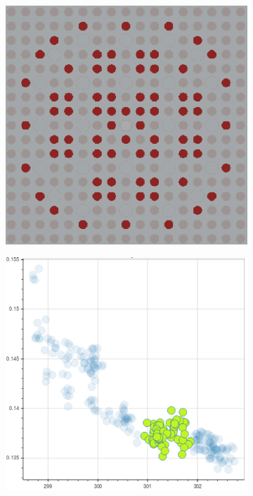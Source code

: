 \begin{figure}[h!]
\begin{subfigure}{0.42\textwidth}
  \caption{}
  \label{fig:chap10-fiss-mean-std-mgxs}
\end{subfigure}
\begin{subfigure}{0.42\textwidth}
  \centering
  \includegraphics[width=0.9\linewidth]{figures/unsupervised/features/assm-16/u235-fiss/mean-std/geometry-2}
  \caption{}
  \label{fig:chap10-fiss-mean-std-geom-2}
\end{subfigure}%
\begin{subfigure}{0.42\textwidth}
  \centering
  \includegraphics[width=0.9\linewidth]{figures/unsupervised/features/assm-16/u235-fiss/mean-std/mgxs-2}

\end{subfigure}
\end{figure}
